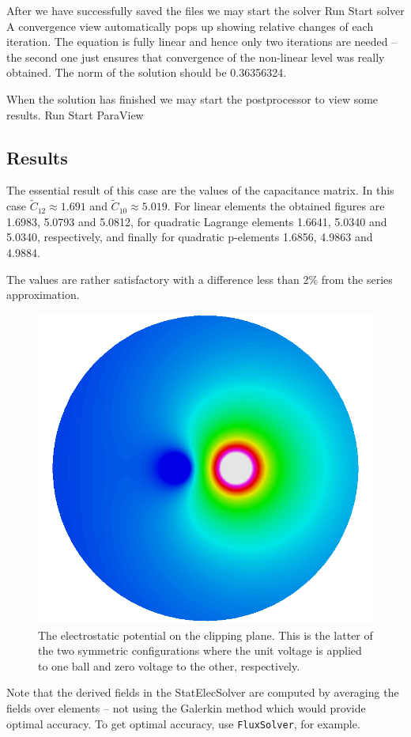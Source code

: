 After we have successfully saved the files we may start the solver
\ttbegin
Run
  Start solver
\ttend
A convergence view automatically pops up showing relative changes of each iteration.
The equation is fully linear and hence only two iterations are needed -- the second 
one just ensures that convergence of the non-linear level was really obtained. 
The norm of the solution should be 0.36356324.

When the solution has finished we may start the postprocessor to view some results.
\ttbegin
Run
  Start ParaView
\ttend


\subsection*{Results}

The essential result of this case are the values of the capacitance matrix.
In this case $\tilde{C}_{12} \approx 1.691$ and $\tilde{C}_{10} \approx 5.019$.
For linear elements the obtained figures are 1.6983, 5.0793 and 5.0812, 
for quadratic Lagrange elements 1.6641, 5.0340 and 5.0340, respectively, and
finally for quadratic p-elements 1.6856, 4.9863 and 4.9884. 

The values are rather satisfactory with a difference less than 2\% from the series approximation.


\begin{figure}[h]
\centering
\includegraphics[width=120 mm]{ElmerPost_capture2}
\caption{The electrostatic potential on the clipping plane. This is the latter of the two symmetric configurations where the
unit voltage is applied to one ball and zero voltage to the other, respectively.}\label{fg:ballspost}
\end{figure}  

Note that the derived fields in the StatElecSolver are computed 
by averaging the fields over elements -- not using the 
Galerkin method which would provide optimal accuracy. To get optimal accuracy, use 
\texttt{FluxSolver}, for example.

